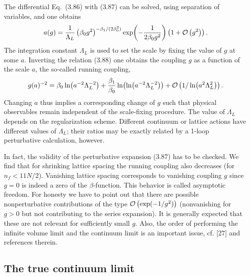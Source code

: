 The differential Eq.~(3.86) with (3.87) can be solved, using separation of
variables, and one obtains
\begin{equation}
  a(g) = \frac{1}{\Lambda_L}\left(\beta_0 g^2\right)^{-\beta_1/(2\beta_0^2)}
    \exp\!\left(-\frac{1}{2\beta_0 g^2}\right)\left(1 + \mathcal{O}\left(g^2\right)\right) .
\end{equation}
The integration constant $\Lambda_L$ is used to set the scale by fixing the
value of $g$ at some $a$. Inverting the relation (3.88) one obtains the
coupling $g$ as a function of the scale $a$, the so-called running coupling,
\begin{equation}
  g(a)^{-2} = \beta_0 \ln\!\left(a^{-2}\Lambda_L^{-2}\right)
  + \frac{\beta_1}{\beta_0}\ln\!\left(\ln\!\left(a^{-2}\Lambda_L^{-2}\right)\right)
  + \mathcal{O}\left(1/\ln\!\left(a^2 \Lambda_L^2\right)\right) .
\end{equation}
Changing $a$ thus implies a corresponding change of $g$ such that physical
observables remain independent of the scale-fixing procedure. The value of
$\Lambda_L$ depends on the regularization scheme. Different continuum or lattice
actions have different values of $\Lambda_L$; their ratios may be exactly
related by a 1-loop perturbative calculation, however.

In fact, the validity of the perturbative expansion (3.87) has to be checked.
We find that for shrinking lattice spacing the running coupling also decreases
(for $n_f < 11N/2$). Vanishing lattice spacing corresponds to vanishing coupling
$g$ since $g = 0$ is indeed a zero of the $\beta$-function. This behavior is
called asymptotic freedom. For honesty we have to point out that there are
possible nonperturbative contributions of the type $\mathcal{O}\left(\exp(-1/g^2)\right)$
(nonvanishing for $g > 0$ but not contributing to the series expansion). It is
generally expected that these are not relevant for sufficiently small $g$. Also,
the order of performing the infinite volume limit and the continuum limit is an
important issue, cf. [27] and references therein.

\subsection{The true continuum limit}

